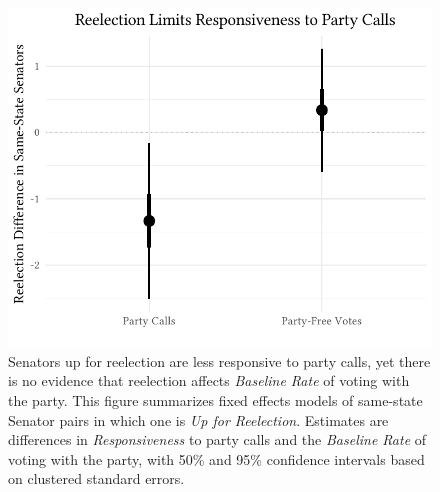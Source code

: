 \documentclass[12pt]{article}
\begin{document}
\begin{figure}[!htbp]
\centering
\includegraphics[width = 12cm]{senate_difference_estimates.pdf}

\caption{Senators up for reelection are less responsive to party calls, yet there is no evidence that reelection affects \textit{Baseline Rate} of voting with the party.  This figure summarizes fixed effects models of same-state Senator pairs in which one is \textit{Up for Reelection}.  Estimates are differences in \textit{Responsiveness} to party calls and the \textit{Baseline Rate} of voting with the party, with 50\% and 95\% confidence intervals based on clustered standard errors.
\label{fig-reelection-responsiveness}}
\end{figure}
\end{document}
